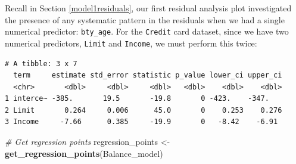 \documentclass[12pt, krantz2,]{krantz}
\makeatletter
\newenvironment{Shaded}{\begin{snugshade}}{\end{snugshade}}
\newcommand{\CommentTok}[1]{\textcolor[rgb]{0.37,0.37,0.37}{\textit{#1}}}
\newcommand{\DataTypeTok}[1]{\textcolor[rgb]{0.27,0.27,0.27}{#1}}
\newcommand{\KeywordTok}[1]{\textcolor[rgb]{0.27,0.27,0.27}{\textbf{#1}}}
\newcommand{\NormalTok}[1]{#1}
\newcommand{\OperatorTok}[1]{\textcolor[rgb]{0.43,0.43,0.43}{\textbf{#1}}}
\newcommand{\StringTok}[1]{\textcolor[rgb]{0.5,0.5,0.5}{#1}}
\newenvironment{kframe}{%
\medskip{}
\setlength{\fboxsep}{.8em}
 \def\at@end@of@kframe{}%
 \ifinner\ifhmode%
  \def\at@end@of@kframe{\end{minipage}}%
  \begin{minipage}{\columnwidth}%
 \fi\fi%
 \def\FrameCommand##1{\hskip\@totalleftmargin \hskip-\fboxsep
 \colorbox{shadecolor}{##1}\hskip-\fboxsep
     \hskip-\linewidth \hskip-\@totalleftmargin \hskip\columnwidth}%
 \MakeFramed {\advance\hsize-\width
   \@totalleftmargin\z@ \linewidth\hsize
   \@setminipage}}%
 {\par\unskip\endMakeFramed%
 \at@end@of@kframe}
\renewenvironment{Shaded}{\begin{kframe}}{\end{kframe}}
\makeatother
\begin{document}
Recall in Section \ref{model1residuals}, our first residual analysis plot investigated the presence of any systematic pattern in the residuals when we had a single numerical predictor: \texttt{bty\_age}. For the \texttt{Credit} card dataset, since we have two numerical predictors, \texttt{Limit} and \texttt{Income}, we must perform this twice:

\begin{Shaded}
\end{Shaded}

\begin{verbatim}
# A tibble: 3 x 7
  term     estimate std_error statistic p_value lower_ci upper_ci
  <chr>       <dbl>     <dbl>     <dbl>   <dbl>    <dbl>    <dbl>
1 interce~ -385.       19.5       -19.8       0 -423.    -347.   
2 Limit       0.264     0.006      45.0       0    0.253    0.276
3 Income     -7.66      0.385     -19.9       0   -8.42    -6.91 
\end{verbatim}

\begin{Shaded}
\begin{Highlighting}[]
\CommentTok{# Get regression points}
\NormalTok{regression_points <-}\StringTok{ }\KeywordTok{get_regression_points}\NormalTok{(Balance_model)}
\end{Highlighting}
\end{Shaded}

\begin{Shaded}
\end{Shaded}
\end{document}
